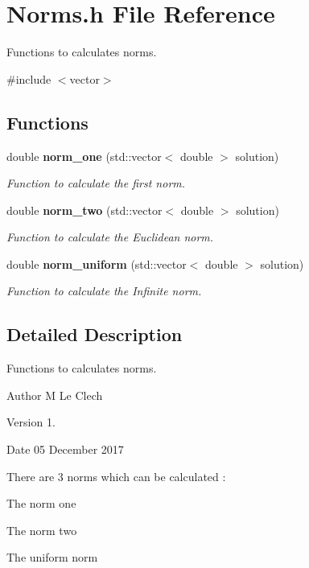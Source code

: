 \section{Norms.\+h File Reference}
\label{_norms_8h}


Functions to calculates norms.  


{\ttfamily \#include $<$vector$>$}\newline
\subsection*{Functions}
\begin{DoxyCompactItemize}
\item 
double \textbf{ norm\+\_\+one} (std\+::vector$<$ double $>$ solution)
\begin{DoxyCompactList}\small\item\em Function to calculate the first norm. \end{DoxyCompactList}\item 
double \textbf{ norm\+\_\+two} (std\+::vector$<$ double $>$ solution)
\begin{DoxyCompactList}\small\item\em Function to calculate the Euclidean norm. \end{DoxyCompactList}\item 
double \textbf{ norm\+\_\+uniform} (std\+::vector$<$ double $>$ solution)
\begin{DoxyCompactList}\small\item\em Function to calculate the Infinite norm. \end{DoxyCompactList}\end{DoxyCompactItemize}


\subsection{Detailed Description}
Functions to calculates norms. 

\begin{DoxyAuthor}{Author}
M Le Clec\textquotesingle{}h 
\end{DoxyAuthor}
\begin{DoxyVersion}{Version}
1. 
\end{DoxyVersion}
\begin{DoxyDate}{Date}
05 December 2017
\end{DoxyDate}
There are 3 norms which can be calculated \+:
\begin{DoxyItemize}
\item The norm one
\item The norm two
\item The uniform norm 
\end{DoxyItemize}

